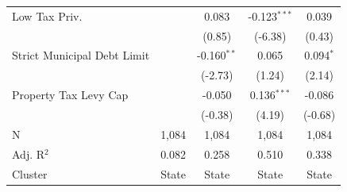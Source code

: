\begin{tabular*}{\textwidth}{@{\extracolsep{\fill}}lcccc}
   Low Tax Priv.               &              & 0.083         & -0.123$^{***}$ & 0.039\\   
                               &              & (0.85)       & (-6.38)       & (0.43)\\   
   Strict Municipal Debt Limit &              & -0.160$^{**}$ & 0.065          & 0.094$^{*}$\\   
                               &              & (-2.73)      & (1.24)        & (2.14)\\   
   Property Tax Levy Cap       &              & -0.050        & 0.136$^{***}$  & -0.086\\   
                               &              & (-0.38)      & (4.19)        & (-0.68)\\   
   \hline
   N                & 1,084        & 1,084         & 1,084          & 1,084\\  
   Adj. R$^2$              & 0.082        & 0.258         & 0.510          & 0.338\\  
   Cluster              & State & State & State & State\\  
   \bottomrule
\end{tabular*}
\par\endgroup
